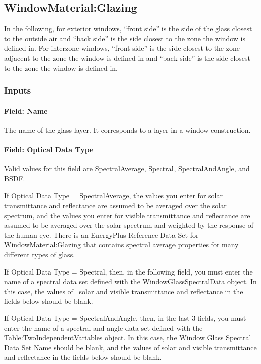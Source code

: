 \subsection{WindowMaterial:Glazing}\label{windowmaterialglazing}

In the following, for exterior windows, ``front side'' is the side of the glass closest to the outside air and ``back side'' is the side closest to the zone the window is defined in. For interzone windows, ``front side'' is the side closest to the zone adjacent to the zone the window is defined in and ``back side'' is the side closest to the zone the window is defined in.

\subsubsection{Inputs}\label{inputs-13-015}

\paragraph{Field: Name}\label{field-name-7-020}

The name of the glass layer. It corresponds to a layer in a window construction.

\paragraph{Field: Optical Data Type}\label{field-optical-data-type}

Valid values for this field are SpectralAverage, Spectral, SpectralAndAngle, and BSDF.

If Optical Data Type = SpectralAverage, the values you enter for solar transmittance and reflectance are assumed to be averaged over the solar spectrum, and the values you enter for visible transmittance and reflectance are assumed to be averaged over the solar spectrum and weighted by the response of~ the human eye. There is an EnergyPlus Reference Data Set for WindowMaterial:Glazing that contains spectral average properties for many different types of glass.

If Optical Data Type = Spectral, then, in the following field, you must enter the name of a spectral data set defined with the WindowGlassSpectralData object. In this case, the values of~ solar and visible transmittance and reflectance in the fields below should be blank.

If Optical Data Type = SpectralAndAngle, then, in the last 3 fields, you must enter the name of a spectral and angle data set defined with the \hyperref[tabletwoindependentvariables]{Table:TwoIndependentVariables} object. In this case, the Window Glass Spectral Data Set Name should be blank, and the values of solar and visible transmittance and reflectance in the fields below should be blank.

